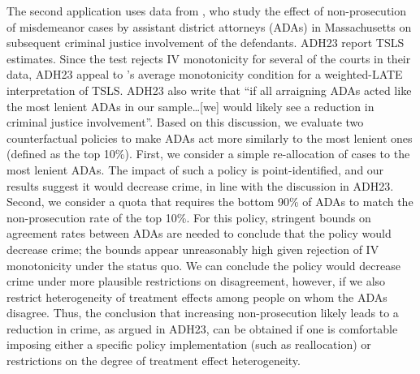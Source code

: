 \documentclass[12pt]{article}%
\theoremstyle{definition}
\newcommand\1{\operatorname{I}\indicatorfence}
\begin{document}
The second application uses data from \textcite[][ADH23]{adh23}, who study the
effect of non-prosecution of misdemeanor cases by assistant district attorneys
(ADAs) in Massachusetts on subsequent criminal justice involvement of the
defendants. ADH23 report TSLS estimates. Since the \textcite{fll23} test rejects
IV monotonicity for several of the courts in their data, ADH23 appeal to
\textcite{fll23}'s average monotonicity condition for a weighted-LATE
interpretation of TSLS\@. ADH23 also write that ``if all arraigning ADAs acted
like the most lenient ADAs in our sample\ldots [we] would likely see a reduction
in criminal justice involvement''. Based on this discussion, we evaluate two
counterfactual policies to make ADAs act more similarly to the most lenient ones
(defined as the top 10\%). First, we consider a simple re-allocation of cases to
the most lenient ADAs. The impact of such a policy is point-identified, and our
results suggest it would decrease crime, in line with the discussion in ADH23.
Second, we consider a quota that requires the bottom 90\% of ADAs to match the
non-prosecution rate of the top 10\%. For this policy, stringent bounds on
agreement rates between ADAs are needed to conclude that the policy would
decrease crime; the bounds appear unreasonably high given rejection of IV
monotonicity under the status quo. We can conclude the policy would decrease crime under more plausible restrictions on disagreement, however, if we also restrict heterogeneity of treatment effects among
people on whom the ADAs disagree. Thus, the conclusion that increasing
non-prosecution likely leads to a reduction in crime, as argued in ADH23, can be
obtained if one is comfortable imposing either a specific policy implementation
(such as reallocation) or restrictions on the degree of treatment effect
heterogeneity.
\end{document}
